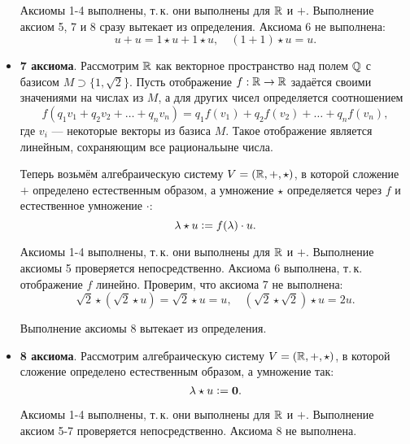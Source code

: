 \begin{solution}
\begin{itemize}
            Аксиомы 1-4 выполнены, т.\,к. они выполнены для $\mathbb{R}$ и $+$. Выполнение аксиом 5, 7 и 8 сразу вытекает из определения. Аксиома 6 не выполнена:
            $$
            u + u = 1 \star u + 1 \star u,\quad (1 + 1) \star u = u.
            $$
        \item \textbf{7 аксиома}. Рассмотрим $\mathbb{R}$ как векторное пространство над полем $\mathbb{Q}$ с базисом $M \supset \{1, \sqrt{2}\}$. Пусть отображение $f: \mathbb{R} \rightarrow \mathbb{R}$ задаётся своими значениями на числах из $M$, а для других чисел определяется соотношением
            $$
            f(q_1v_1 + q_2v_2 + \ldots + q_nv_n) = q_1f(v_1) + q_2f(v_2) + \ldots + q_nf(v_n),
            $$
            где $v_i$ --- некоторые векторы из базиса $M$. Такое отображение является линейным, сохраняющим все рациональыне числа.

            Теперь возьмём алгебраическую систему $V = (\mathbb{R}, +, \star)$, в которой сложение $+$ определено естественным образом, а умножение $\star$ определяется через $f$ и естественное умножение $\boldsymbol{\cdot}$:
            $$
            \lambda \star u \vcentcolon = f(\lambda) \cdot u.
            $$

            Аксиомы 1-4 выполнены, т.\,к. они выполнены для $\mathbb{R}$ и $+$. Выполнение аксиомы 5 проверяется непосредственно. Аксиома 6 выполнена, т.\,к. отображение $f$ линейно. Проверим, что аксиома 7 не выполнена:
            $$
            \sqrt{2} \star (\sqrt{2} \star u) = \sqrt{2} \star u = u,\quad (\sqrt{2} \star \sqrt{2}) \star u = 2u.
            $$

            Выполнение аксиомы 8 вытекает из определения.
        \item \textbf{8 аксиома}. Рассмотрим алгебраическую систему $V = (\mathbb{R}, +, \star)$, в которой сложение определено естественным образом, а умножение так:
            $$
            \lambda \star u \vcentcolon = \boldsymbol{0}.
            $$

            Аксиомы 1-4 выполнены, т.\,к. они выполнены для $\mathbb{R}$ и $+$. Выполнение аксиом 5-7 проверяется непосредственно. Аксиома 8 не выполнена.
    \end{itemize}
\end{solution}

